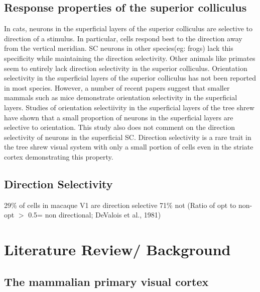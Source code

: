 	\subsection{Response properties of the superior colliculus}
	In cats, neurons in the superficial layers of the superior colliculus are selective to direction of a stimulus. In particular, cells respond best to the direction away from the vertical meridian. SC neurons in other species(eg: frogs) lack this specificity while maintaining the direction selectivity. Other animals like primates seem to entirely lack direction selectivity in the superior colliculus. 
	Orientation selectivity in the superficial layers of the superior colliculus has not been reported in most species. However, a number of recent papers suggest that smaller mammals such as mice demonstrate orientation selectivity in the superficial layers. Studies of orientation selectiivity in the superficial layers of the tree shrew have shown that a small proportion of neurons in the superficial layers are selective to orientation. This study also does not comment on the direction selectivity of neurons in the superficial SC. Direction selectivity is a rare trait in the tree shrew visual system with only a small portion of cells even in the striate cortex demonstrating this property. 
	\subsection{Direction Selectivity}
	29\% of cells in macaque V1 are direction selective 71\% not (Ratio of opt to non-opt $>$ 0.5= non directional; DeValois et al., 1981)





	\section{Literature Review/ Background}
	\subsection{The mammalian primary visual cortex}

